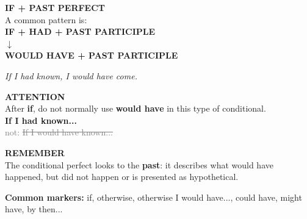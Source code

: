 \documentclass[a4paper,11pt]{article}
\begin{document}
\begin{minipage}{0.91\textwidth}
\vspace{2mm}
\begin{minipage}{0.485\textwidth}
\begin{violetbox}[height=3.15cm]
\textbf{\color{VioletDark}IF + PAST PERFECT}\\[1mm]
A common pattern is:\\[1mm]
\centering
\textbf{IF + HAD + PAST PARTICIPLE}\\
$\downarrow$\\
\textbf{WOULD HAVE + PAST PARTICIPLE}\\[1mm]
\raggedright
\textit{If I had known, I would have come.}
\end{violetbox}
\end{minipage}\hfill
\begin{minipage}{0.485\textwidth}
\begin{warnbox}[height=3.15cm]
\textbf{\color{Red}ATTENTION}\\[1mm]
After \textbf{if}, do not normally use \textbf{would have} in this type of conditional.\\[1mm]
\textbf{If I had known...}\\
\textcolor{Grey}{not: \sout{If I would have known...}}
\end{warnbox}
\end{minipage}

\vspace{2mm}
\begin{violetbox}
\textbf{\color{VioletDark}REMEMBER}\\[1mm]
The conditional perfect looks to the \textbf{past}: it describes what would have happened,
but did not happen or is presented as hypothetical.
\end{violetbox}

\vspace{1.5mm}\centering
{\small\color{Grey}\textbf{Common markers:} if, otherwise, otherwise I would have..., could have, might have, by then...}

\end{minipage}
\end{document}
